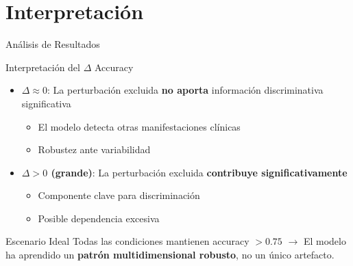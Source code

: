 \documentclass[aspectratio=169]{beamer}
\begin{document}
\section{Interpretación}

\begin{frame}{Análisis de Resultados}
\begin{block}{Interpretación del $\Delta$ Accuracy}
\begin{itemize}
\item \textcolor{green!70!black}{\textbf{$\Delta \approx 0$}}: La perturbación excluida \textbf{no aporta} información discriminativa significativa
\begin{itemize}
\item[$\rightarrow$] El modelo detecta otras manifestaciones clínicas
\item[$\rightarrow$] Robustez ante variabilidad
\end{itemize}

\vspace{0.3cm}

\item \textcolor{red!70!black}{\textbf{$\Delta > 0$ (grande)}}: La perturbación excluida \textbf{contribuye significativamente}
\begin{itemize}
\item[$\rightarrow$] Componente clave para discriminación
\item[$\rightarrow$] Posible dependencia excesiva
\end{itemize}
\end{itemize}
\end{block}

\vspace{0.3cm}

\begin{alertblock}{Escenario Ideal}
Todas las condiciones mantienen accuracy $> 0.75$ $\rightarrow$ El modelo ha aprendido un \textbf{patrón multidimensional robusto}, no un único artefacto.
\end{alertblock}
\end{frame}
\end{document}
